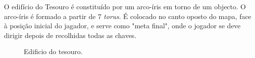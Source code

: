 	O edifício do Tesouro é constituído por um arco-íris em torno de um objecto. O arco-íris é formado a partir de 7 \textit{torus}. É colocado no canto oposto do mapa, face à posição inicial do jagador, e serve como "meta final", onde o jogador se deve dirigir depois de recolhidas todas as chaves.


\begin{figure}[here]
                 \caption{Edificio do tesouro.}
                 \label{fig:prototype}
\end{figure}
